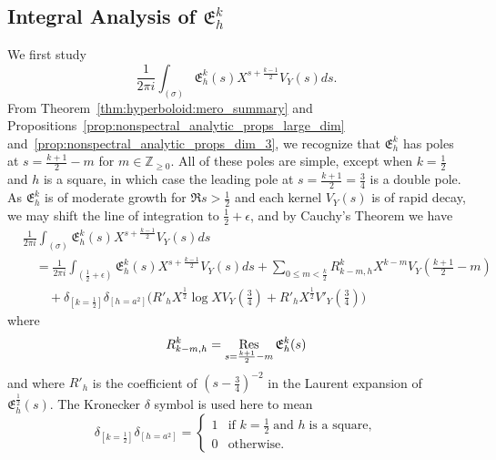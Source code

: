 \subsection{Integral Analysis of $\mathfrak{E}_h^k$}


We first study
\begin{equation}
  \frac{1}{2\pi i} \int_{(\sigma)} \mathfrak{E}_h^k(s) X^{s + \frac{k-1}{2}} V_Y(s) ds.
\end{equation}
From Theorem~\ref{thm:hyperboloid:mero_summary} and
Propositions~\ref{prop:nonspectral_analytic_props_large_dim}
and~\ref{prop:nonspectral_analytic_props_dim_3}, we recognize that $\mathfrak{E}_h^k$ has
poles at $s = \frac{k+1}{2} - m$ for $m \in \mathbb{Z}_{\geq 0}$.
All of these poles are simple, except when $k = \frac{1}{2}$ and $h$ is a square, in which
case the leading pole at $s = \frac{k+1}{2} = \frac{3}{4}$ is a double pole.
As $\mathfrak{E}_h^k$ is of moderate growth for $\Re s > \frac{1}{2}$ and each kernel
$V_Y(s)$ is of rapid decay, we may shift the line of integration to $\frac{1}{2} +
\epsilon$, and by Cauchy's Theorem we have
\begin{equation}\label{eq:hyp:integral_MT}
  \begin{split}
    &\frac{1}{2\pi i} \int_{(\sigma)} \mathfrak{E}_h^k(s) X^{s + \frac{k-1}{2}} V_Y(s) ds \\
    &\quad = \frac{1}{2\pi i} \int_{(\frac{1}{2} + \epsilon)} \mathfrak{E}_h^k(s) X^{s +
    \frac{k-1}{2}} V_Y(s) ds + \sum_{0 \leq m < \frac{k}{2}} R_{k-m,h}^k X^{k - m}
    V_Y(\tfrac{k+1}{2} - m) \\
    &\qquad + \delta_{[k=\frac{1}{2}]} \delta_{[h = a^2]} \bigg( R'_h X^{\frac{1}{2}} \log X
  V_Y(\tfrac{3}{4}) + R'_h X^{\frac{1}{2}} V'_Y(\tfrac{3}{4}) \bigg)
  \end{split}
\end{equation}
where
\begin{equation}
  R_{k-m,h}^k = \operatorname*{Res}_{s = \frac{k+1}{2} - m} \mathfrak{E}_h^k(s)
\end{equation}
and where $R'_h$ is the coefficient of $(s - \tfrac{3}{4})^{-2}$ in the Laurent expansion
of $\mathfrak{E}_h^{\frac{1}{2}}(s)$.
The Kronecker $\delta$ symbol is used here to mean
\begin{equation}
  \delta_{[k = \frac{1}{2}]} \delta_{[h = a^2]} = \begin{cases}
    1 & \text{if } k = \frac{1}{2} \; \text{and } h \; \text{is a square}, \\
    0 & \text{otherwise}.
  \end{cases}
\end{equation}



